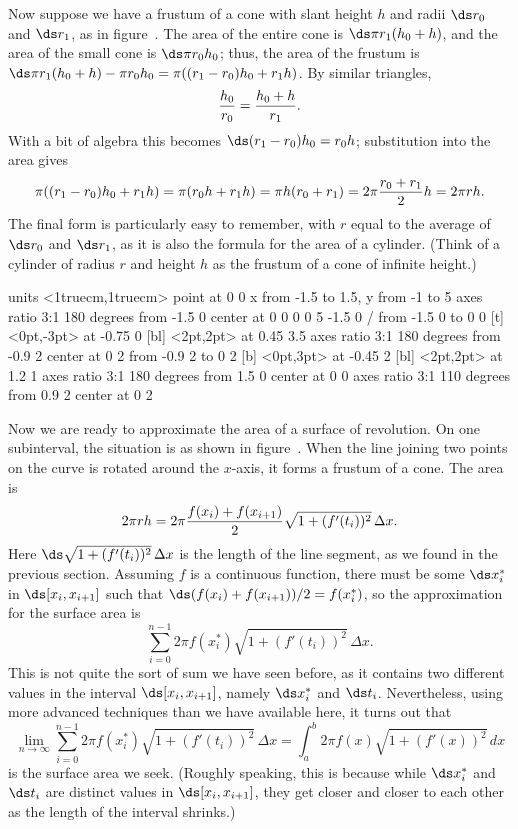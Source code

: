 Now suppose we have a frustum of a cone with slant height $h$ and
radii $\ds r_0$ and $\ds r_1$, as in figure~. The area of
the entire cone is $\ds \pi r_1(h_0+h)$, and the area of the small cone is
$\ds \pi r_0 h_0$; thus, the area of the frustum is $\ds \pi r_1(h_0+h)-\pi
r_0 h_0=\pi((r_1-r_0)h_0+r_1h)$. By similar triangles, 
$${h_0\over r_0}={h_0+h\over r_1}.$$
With a bit of algebra this becomes $\ds (r_1-r_0)h_0= r_0h$; substitution
into the area gives
$$
  \pi((r_1-r_0)h_0+r_1h)=\pi(r_0h+r_1h)=\pi h(r_0+r_1)=2\pi
  {r_0+r_1\over2} h = 2\pi r h.
$$
The final form is particularly easy to remember, with $r$ equal to the
average of $\ds r_0$ and $\ds r_1$, as it is also the formula for the area of
a cylinder. (Think of a cylinder of radius $r$ and height $h$ as the
frustum of a cone of infinite height.)

\figure
\vbox{\beginpicture
\normalgraphs
\sevenpoint
\setcoordinatesystem units <1truecm,1truecm> point at 0 0
\setplotarea x from -1.5 to 1.5, y from -1 to 5
\ellipticalarc  axes ratio 3:1  180 degrees from -1.5 0 center at 0 0
 0 0 5 -1.5 0 /
\putrule from -1.5 0 to 0 0
 [t] <0pt,-3pt> at -0.75 0
 [bl] <2pt,2pt> at 0.45 3.5 
\ellipticalarc  axes ratio 3:1  180 degrees from -0.9 2 center at 0 2
\putrule from -0.9 2 to 0 2
 [b] <0pt,3pt> at -0.45 2
 [bl] <2pt,2pt> at 1.2 1
\setdashes
\ellipticalarc  axes ratio 3:1  180 degrees from 1.5 0 center at 0 0
\ellipticalarc  axes ratio 3:1  110 degrees from 0.9 2 center at 0 2
\endpicture}

Now we are ready to approximate the area of a surface of
revolution. On one subinterval, the situation is as shown in
figure~. When the line joining two
points on the curve is rotated around the $x$-axis, it forms a frustum
of a cone. The area is
$$
  2\pi r h= 2\pi {f(x_i)+f(x_{i+1})\over2}
    \sqrt{1+(f'(t_i))^2}\,\Delta x.
$$
Here
$\ds \sqrt{1+(f'(t_i))^2}\,\Delta x$ is the length of the line segment, 
as we found in the previous section. Assuming $f$ is a continuous
function, there must be some $\ds x_i^*$ in $\ds [x_i,x_{i+1}]$
such that
$\ds (f(x_i)+f(x_{i+1}))/2 = f(x_i^*)$, so
the approximation for the
surface area is
$$\sum_{i=0}^{n-1} 2\pi f(x_i^*)\sqrt{1+(f'(t_i))^2}\,\Delta x.$$
This is not quite the sort of sum we have seen before, as it contains
two different values in the interval $\ds [x_i,x_{i+1}]$, namely
$\ds x_i^*$ and $\ds t_i$. Nevertheless, using more advanced techniques
than we have available here, it turns out that
$$\lim_{n\to\infty} 
\sum_{i=0}^{n-1} 2\pi f(x_i^*)\sqrt{1+(f'(t_i))^2}\,\Delta x=
\int_a^b 2\pi f(x)\sqrt{1+(f'(x))^2}\,dx$$ 
is the surface area we seek. (Roughly speaking, this is because while
$\ds x_i^*$ and $\ds t_i$ are distinct values in $\ds[x_i,x_{i+1}]$,
they get closer and closer to each other as the length of the interval
shrinks.) 

